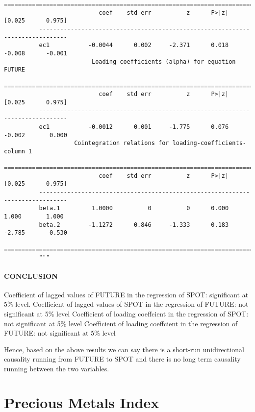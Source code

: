 \documentclass[11pt]{article}
\begin{document}
\begin{Verbatim}[commandchars=\\\{\}]
          ==============================================================================
                           coef    std err          z      P>|z|      [0.025      0.975]
          ------------------------------------------------------------------------------
          ec1           -0.0044      0.002     -2.371      0.018      -0.008      -0.001
                         Loading coefficients (alpha) for equation FUTURE               
          ==============================================================================
                           coef    std err          z      P>|z|      [0.025      0.975]
          ------------------------------------------------------------------------------
          ec1           -0.0012      0.001     -1.775      0.076      -0.002       0.000
                    Cointegration relations for loading-coefficients-column 1           
          ==============================================================================
                           coef    std err          z      P>|z|      [0.025      0.975]
          ------------------------------------------------------------------------------
          beta.1         1.0000          0          0      0.000       1.000       1.000
          beta.2        -1.1272      0.846     -1.333      0.183      -2.785       0.530
          ==============================================================================
          """
\end{Verbatim}
            
    \paragraph{CONCLUSION}\label{conclusion}

    Coefficient of lagged values of FUTURE in the regression of SPOT:
significant at 5\% level. Coefficient of lagged values of SPOT in the
regression of FUTURE: not significant at 5\% level Coefficient of
loading coeffcient in the regression of SPOT: not significant at 5\%
level Coefficient of loading coeffcient in the regression of FUTURE: not
significant at 5\% level

Hence, based on the above results we can say there is a short-run
unidirectional causality running from FUTURE to SPOT and there is no
long term causality running between the two variables.

    \section{Precious Metals Index}\label{precious-metals-index}
\end{document}
